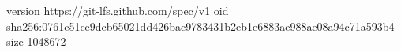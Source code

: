 version https://git-lfs.github.com/spec/v1
oid sha256:0761c51ce9dcb65021dd426bac9783431b2eb1e6883ae988ae08a94c71a593b4
size 1048672
